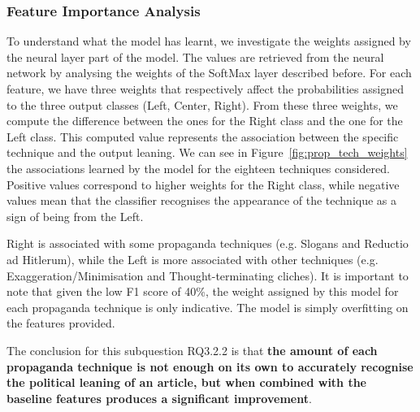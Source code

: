 \subsubsection{Feature Importance Analysis}
To understand what the model has learnt, we investigate the weights assigned by the neural layer part of the model.
The values are retrieved from the neural network by analysing the weights of the SoftMax layer described before.
For each feature, we have three weights that respectively affect the probabilities assigned to the three output classes (Left, Center, Right).
From these three weights, we compute the difference between the ones for the Right class and the one for the Left class. This computed value represents the association between the specific technique and the output leaning.
We can see in Figure~\ref{fig:prop_tech_weights} the associations learned by the model for the eighteen techniques considered.
Positive values correspond to higher weights for the Right class, while negative values mean that the classifier recognises the appearance of the technique as a sign of being from the Left.

Right is associated with some propaganda techniques (e.g. Slogans and Reductio ad Hitlerum), while the Left is more associated with other techniques (e.g. Exaggeration/Minimisation and Thought-terminating cliches).
It is important to note that given the low F1 score of 40\%, the weight assigned by this model for each propaganda technique is only indicative. %
The model is simply overfitting on the features provided.




The conclusion for this subquestion RQ3.2.2 is that \textbf{the amount of each propaganda technique is not enough on its own to accurately recognise the political leaning of an article, but when combined with the baseline features produces a significant improvement}.


